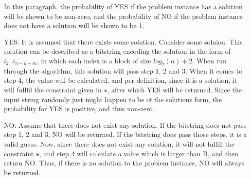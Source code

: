 In this paragraph, the probability of YES if the problem instance has a solution
will be shown to be non-zero, and the probability of NO if the problem instance
does not have a solution will be shown to be 1.

YES: It is assumed that there exists some solution. Consider some soluion.
This solution can be described as a bitstring encoding the solution in the form
of \(i_2..i_{n-k-m}\), in which each index is a block of size \(log_2(n)+2\).
When run through the algorithm, this solution will pass step 1, 2 and 3.
When it comes to step 4, the value will be calculated, and per definition,
since it is a solution, it will fullfil the constraint given in \(\star\),
after which YES will be returned. Since the input string randomly just
might happen to be of the solutions form, the probability for YES is positive,
and thus non-zero.

NO: Assume that there does not exist any solution. If the bitstring does not
pass step 1, 2 and 3, NO will be returned. If the bitstring does pass those
steps, it is a valid guess. Now, since there does not exist any solution,
it will not fulfill the constraint \(\star\), and step 4 will calculate a value
which is larger than B, and then return NO. Thus, if there is no solution
to the problem instance, NO will always be returned.


